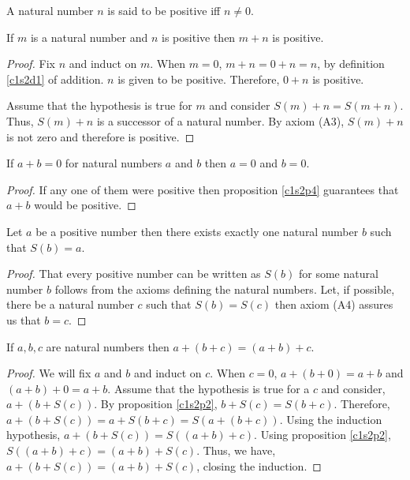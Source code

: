 \begin{defn}\label{c1s2d2}
A natural number $n$ is said to be positive iff $n \ne 0$.
\end{defn}

\begin{prop}\label{c1s2p4}
If $m$ is a natural number and $n$ is positive then $m + n$ is positive.
\end{prop}
\begin{proof}
Fix $n$ and induct on $m$. When $m = 0$, $m + n = 0 + n = n$, by definition
\ref{c1s2d1} of addition. $n$ is given to be positive. Therefore, $0 + n$
is positive.

Assume that the hypothesis is true for $m$ and consider $S(m) + n = S(m + 
n)$. Thus, $S(m) + n$ is a successor of a natural number. By axiom (A3), 
$S(m) + n$ is not zero and therefore is positive.
\end{proof}

\begin{cor}\label{c1s2c1}
If $a + b = 0$ for natural numbers $a$ and $b$ then $a = 0$ and $b = 0$.
\end{cor}
\begin{proof}
If any one of them were positive then proposition \ref{c1s2p4} guarantees 
that $a + b$ would be positive.
\end{proof}

\begin{prop}\label{c1s2p5}
Let $a$ be a positive number then there exists exactly one natural number 
$b$ such that $S(b) = a$.
\end{prop}
\begin{proof}
That every positive number can be written as $S(b)$ for some natural number
$b$ follows from the axioms defining the natural numbers. Let, if possible,
there be a natural number $c$ such that $S(b) = S(c)$ then axiom (A4)
assures us that $b = c$.
\end{proof}

\begin{prop}\label{c1s2p6}
If $a, b, c$ are natural numbers then $a + (b + c) = (a + b) + c$.
\end{prop}
\begin{proof}
We will fix $a$ and $b$ and induct on $c$. When $c = 0$, $a + (b + 0) = a
+ b$ and $(a + b) + 0 = a + b$. Assume that the hypothesis is true for a 
$c$ and consider, $a + (b + S(c))$. By proposition \ref{c1s2p2}, $b + S(c)
= S(b + c)$. Therefore, $a + (b + S(c)) = a + S(b + c) = S(a + (b + c))$. 
Using the induction hypothesis, $a + (b + S(c)) = S((a + b) + c)$. Using
proposition \ref{c1s2p2}, $S((a + b) + c) = (a + b) + S(c)$. Thus, we have,
$a + (b + S(c)) = (a + b) + S(c)$, closing the induction.
\end{proof}

